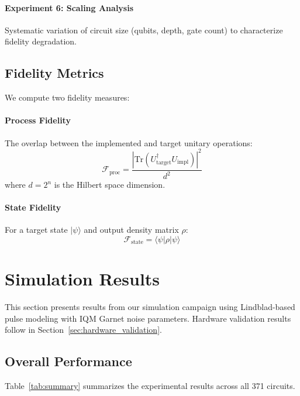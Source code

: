 \documentclass[twocolumn,showpacs,preprintnumbers,amsmath,amssymb,prb]{revtex4-2}
\newcommand{\ket}[1]{|#1\rangle}
\newcommand{\bra}[1]{\langle#1|}
\newcommand{\fid}{\mathcal{F}}
\begin{document}
\paragraph{Experiment 6: Scaling Analysis} Systematic variation of circuit size (qubits, depth, gate count) to characterize fidelity degradation.

\subsection{Fidelity Metrics}

We compute two fidelity measures:

\paragraph{Process Fidelity} The overlap between the implemented and target unitary operations:
\begin{equation}
    \fid_{\text{proc}} = \frac{|\text{Tr}(U_{\text{target}}^{\dagger} U_{\text{impl}})|^2}{d^2}
\end{equation}
where $d = 2^n$ is the Hilbert space dimension.

\paragraph{State Fidelity} For a target state $\ket{\psi}$ and output density matrix $\rho$:
\begin{equation}
    \fid_{\text{state}} = \bra{\psi}\rho\ket{\psi}
\end{equation}

\section{Simulation Results}
\label{sec:results}

This section presents results from our simulation campaign using Lindblad-based pulse modeling with IQM Garnet noise parameters. Hardware validation results follow in Section~\ref{sec:hardware_validation}.

\subsection{Overall Performance}

Table~\ref{tab:summary} summarizes the experimental results across all 371 circuits.
\end{document}
